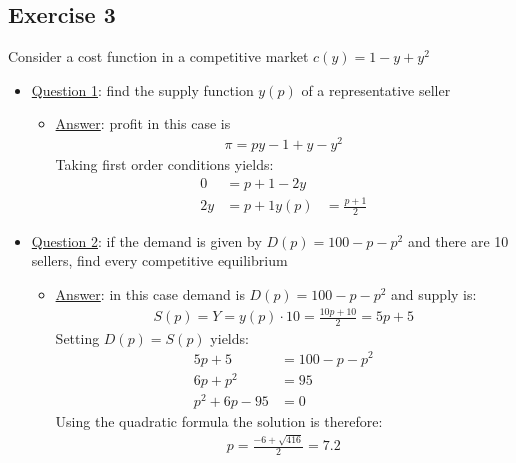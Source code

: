 \documentclass{article}
\begin{document}
\par
\subsection{Exercise 3}
Consider a cost function in a competitive market $c(y) = 1 - y + y^{2}$
\par \vspace{0.3em}
  \begin{itemize}
    \item  \underline{Question 1}: find the supply function $y(p)$ of a representative seller
    \begin{itemize}
      \item  \underline{Answer}: profit in this case is
      \begin{gather*}
        \pi = py - 1 + y - y^{2}
      \end{gather*}
      Taking first order conditions yields:
      \begin{align*}
        0 &= p + 1 - 2y \\
        2y &= p + 1
        y(p) &= \frac{p+1}{2}
      \end{align*}
    \end{itemize}
  \end{itemize}
  \begin{itemize}
    \item  \underline{Question 2}: if the demand is given by $D(p) = 100 - p - p^{2}$ and there are 10 sellers, find every competitive equilibrium
    \begin{itemize}
      \item  \underline{Answer}: in this case demand is $D(p) = 100 - p - p^{2}$ and supply is:
      \begin{gather*}
        S(p) = Y = y(p) \cdot 10 = \frac{10p + 10}{2} = 5p + 5
      \end{gather*}
      Setting $D(p) = S(p)$ yields:
      \begin{align*}
        5p + 5 &= 100 - p - p^{2} \\
        6p + p^{2} &= 95 \\
        p^{2} + 6p - 95 &= 0
      \end{align*}
      Using the quadratic formula the solution is therefore:
      \begin{gather*}
        p = \frac{-6 + \sqrt{416}}{2} = 7.2
      \end{gather*}
    \end{itemize}
  \end{itemize}
\end{document}
